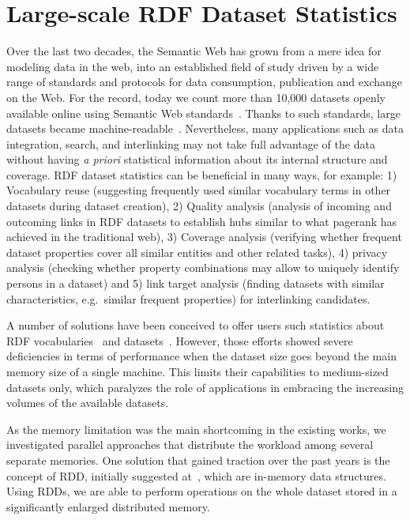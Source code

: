 \chapter{ Large-scale RDF Dataset Statistics}
\label{chapter:dist_lod_stats}

Over the last two decades, the Semantic Web has grown from a mere idea for modeling data in the web, into an established field of study driven by a wide range of standards and protocols for data consumption, publication and exchange on the Web.
For the record, today we count more than 10,000 datasets openly available online using Semantic Web standards~.
Thanks to such standards, large datasets became machine-readable~\cite{rw2014}.
Nevertheless, many applications such as data integration, search, and interlinking may not take full advantage of the data without having \textit{a priori} statistical information about its internal structure and coverage. 
\gls{RDF} dataset statistics can be beneficial in many ways, for example: 1) Vocabulary reuse (suggesting frequently used similar vocabulary terms in other datasets during dataset creation), 2) Quality analysis (analysis of incoming and outcoming links in \gls{RDF} datasets to establish hubs similar to what pagerank has achieved in the traditional web), 3) Coverage analysis (verifying whether frequent dataset properties cover all similar entities and other related tasks), 4) privacy analysis (checking whether property combinations may allow to uniquely identify persons in a dataset) and 5) link target analysis (finding datasets with similar characteristics, e.g.~similar frequent properties) for interlinking candidates.

A number of solutions have been conceived to offer users such statistics about \gls{RDF} vocabularies~\cite{vandenbussche2015linked} and datasets~\cite{conf/dexaw/LangeggerW09,ermilov-2013-kesw}.
However, those efforts showed severe deficiencies in terms of performance when the dataset size goes beyond the main memory size of a single machine.
This limits their capabilities to medium-sized datasets only, which paralyzes the role of applications in embracing the increasing volumes of the available datasets.

As the memory limitation was the main shortcoming in the existing works, we investigated parallel approaches that distribute the workload among several separate memories.
One solution that gained traction over the past years is the concept of \gls{RDD}, initially suggested at~\cite{zaharia2012resilient}, which are in-memory data structures. 
Using RDDs, we are able to perform operations on the whole dataset stored in a significantly enlarged distributed memory.


